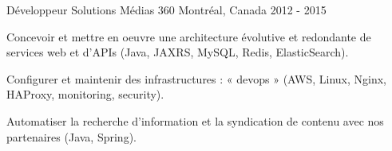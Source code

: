 \begin{cventries}
  \cventry
    {Développeur} %
    {Solutions Médias 360} %
    {Montréal, Canada} %
    {2012 - 2015} %
    {
      \begin{cvitems} %
        \item {Concevoir et mettre en oeuvre une architecture évolutive et redondante de services web et d’APIs (Java, JAXRS, MySQL, Redis, ElasticSearch).}
        \item {Configurer et maintenir des infrastructures : « devops » (AWS, Linux, Nginx, HAProxy, monitoring, security).}
        \item {Automatiser la recherche d'information et la syndication de contenu avec nos partenaires (Java, Spring).}
      \end{cvitems}
    }




\end{cventries}
